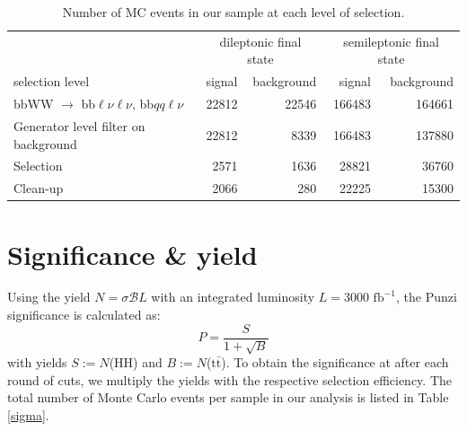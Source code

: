 \documentclass[10pt,a4paper]{article}
\renewcommand{\tt}{$\text{t}\bar{\text{t}}$}
\newcommand{\channels}{bbWW $\rightarrow$ bb$\ell\nu\ell\nu$, bb$qq\ell\nu$} %
\newcommand{\BR}{\mathcal{B}}
\begin{document}
\begin{table}[p]
	\centering
	\caption{Number of MC events in our sample at each level of selection.} \vspace{5pt}
	\label{raw}
	\begin{tabular}{@{\quad}lrrrr@{}}
	
	\toprule
	               & \multicolumn{2}{c}{dileptonic final state} & \multicolumn{2}{c}{semileptonic final state} \\
	\cmidrule(r){2-3} \cmidrule(r){4-5}
	selection level                      &  signal  & background &  signal  & background \\
	\midrule
	\channels				             &  22812  &  22546 & 166483 & 164661 \\
	Generator level filter on background &  22812  &   8339 & 166483 & 137880 \\
	Selection                            &   2571  &   1636 &  28821 &  36760 \\
	Clean-up                             &   2066  &    280 &  22225 &  15300 \\
	\bottomrule
	
	\end{tabular}
\end{table}





\section{Significance \& yield}

Using the yield $N = \sigma \BR L$ with an integrated luminosity $L = 3000 \text{ fb}^{-1}$, the Punzi significance is calculated as:
\begin{equation} \label{P}
	P = \frac{S}{1+\sqrt{B}}
\end{equation}
with yields $S:=N$(HH) and $B:=N$(\tt). To obtain the significance at after each round of cuts, we multiply the yields with the respective selection efficiency. %
The total number of Monte Carlo events per sample in our analysis is listed in Table \ref{sigma}. %
\end{document}
